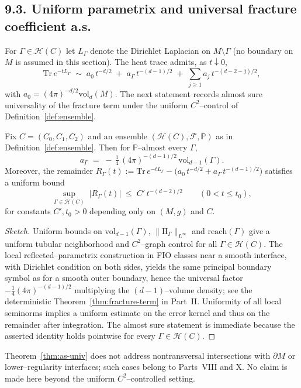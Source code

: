 \subsection*{9.3. Uniform parametrix and universal fracture coefficient a.s.}
For $\Gamma\in \mathcal{H}(C)$ let $L_\Gamma$ denote the Dirichlet Laplacian on $M\setminus \Gamma$ (no boundary on $M$ is assumed in this section). The heat trace admits, as $t\downarrow 0$,
\[
\mathrm{Tr}\,e^{-tL_\Gamma}\;\sim\;a_0\,t^{-d/2}\;+\;a_\Gamma\,t^{-(d-1)/2}\;+\;\sum_{j\ge 1} a_j\,t^{-(d-2-j)/2},
\]
with $a_0=(4\pi)^{-d/2}\mathrm{vol}_d(M)$. The next statement records almost sure universality of the fracture term under the uniform $C^2$–control of Definition~\ref{def:ensemble}.

\begin{theorem}\label{thm:as-univ}
Fix $C=(C_0,C_1,C_2)$ and an ensemble $(\mathcal{H}(C),\mathcal{F},\mathbb{P})$ as in Definition~\ref{def:ensemble}. Then for $\mathbb{P}$–almost every $\Gamma$,
\[
a_\Gamma \;=\; -\,\tfrac14\,(4\pi)^{-(d-1)/2}\,\mathrm{vol}_{d-1}(\Gamma).
\]
Moreover, the remainder $R_\Gamma(t):=\mathrm{Tr}\,e^{-tL_\Gamma}-\big(a_0\,t^{-d/2}+a_\Gamma\,t^{-(d-1)/2}\big)$ satisfies a uniform bound
\[
\sup_{\Gamma\in \mathcal{H}(C)}\;\big|R_\Gamma(t)\big|\;\le\;C'\,t^{-(d-2)/2}\qquad (0<t\le t_0),
\]
for constants $C',t_0>0$ depending only on $(M,g)$ and $C$.
\end{theorem}

\begin{proof}[Sketch]
Uniform bounds on $\mathrm{vol}_{d-1}(\Gamma)$, $\|\mathrm{II}_\Gamma\|_{L^\infty}$ and $\mathrm{reach}(\Gamma)$ give a uniform tubular neighborhood and $C^2$–graph control for all $\Gamma\in\mathcal{H}(C)$. The local reflected–parametrix construction in FIO classes near a smooth interface, with Dirichlet condition on both sides, yields the same principal boundary symbol as for a smooth outer boundary, hence the universal factor $-\tfrac14(4\pi)^{-(d-1)/2}$ multiplying the $(d-1)$–volume density; see the deterministic Theorem~\ref{thm:fracture-term} in Part~II. Uniformity of all local seminorms implies a uniform estimate on the error kernel and thus on the remainder after integration. The almost sure statement is immediate because the asserted identity holds pointwise for every $\Gamma\in\mathcal{H}(C)$. 
\end{proof}

\begin{remark}[Scope]
Theorem~\ref{thm:as-univ} does not address nontransversal intersections with $\partial M$ or lower–regularity interfaces; such cases belong to Parts~VIII and X. No claim is made here beyond the uniform $C^2$–controlled setting.
\end{remark}

